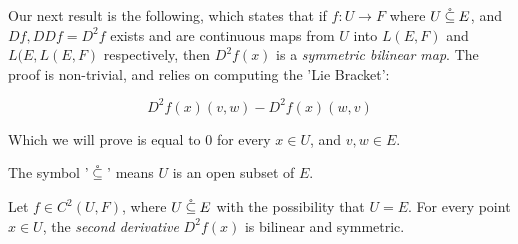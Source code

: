 \documentclass[../main-manifolds.tex]{subfiles}
\begin{document}
Our next result is the following, which states that if $f: U\to F$ where $U\:\mathring{\subseteq}\: E$, and $Df, DDf = D^2f$ exists and are continuous maps from $U$ into $L(E,F)$ and $L(E,L(E,F)$ respectively, then $D^2f(x)$ is a \emph{symmetric bilinear map}. The proof is non-trivial, and relies on computing the 'Lie Bracket':

\[
    D^2f(x)(v,w) - D^2f(x)(w,v)
\]

Which we will prove is equal to $0$ for every $x\in U$, and $v,w\in E$.

\begin{note}
The symbol '$\:\mathring{\subseteq}\:$' means $U$ is an open subset of $E$.    
\end{note}

\begin{wts}
    Let $f\in C^2(U, F)$, where $U\:\mathring{\subseteq}\: E$ with the possibility that $U = E$. For every point $x\in U$, the \emph{second derivative} $D^2f(x)$ is bilinear and symmetric.
\end{wts}
\end{document}
